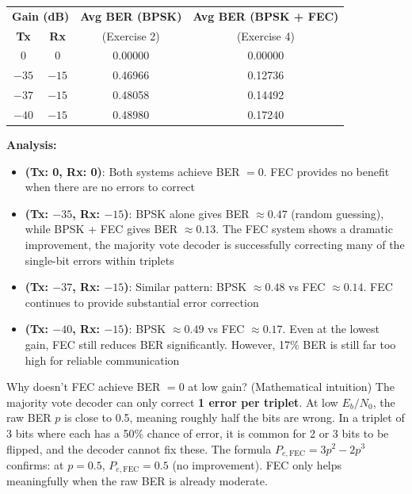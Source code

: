 \begin{center}
\renewcommand{\arraystretch}{1.4}
\begin{tabular}{cc|c|c}
\hline
\multicolumn{2}{c|}{\textbf{Gain (dB)}} & \textbf{Avg BER (BPSK)} & \textbf{Avg BER (BPSK + FEC)} \\
\textbf{Tx} & \textbf{Rx} & (Exercise 2) & (Exercise 4) \\
\hline
0 & 0 & 0.00000 & 0.00000 \\
$-35$ & $-15$ & 0.46966 & 0.12736 \\
$-37$ & $-15$ & 0.48058 & 0.14492 \\
$-40$ & $-15$ & 0.48980 & 0.17240 \\
\hline
\end{tabular}
\end{center}

\textbf{Analysis:}

\begin{itemize}
\item \textbf{(Tx: 0, Rx: 0)}: Both systems achieve BER $= 0$. FEC provides no benefit when there are no errors to correct

\item \textbf{(Tx: $-35$, Rx: $-15$)}: BPSK alone gives BER $\approx 0.47$ (random guessing), while BPSK + FEC gives BER $\approx 0.13$. The FEC system shows a dramatic improvement, the majority vote decoder is successfully correcting many of the single-bit errors within triplets

\item \textbf{(Tx: $-37$, Rx: $-15$)}: Similar pattern: BPSK $\approx 0.48$ vs FEC $\approx 0.14$. FEC continues to provide substantial error correction

\item \textbf{(Tx: $-40$, Rx: $-15$)}: BPSK $\approx 0.49$ vs FEC $\approx 0.17$. Even at the lowest gain, FEC still reduces BER significantly. However, 17\% BER is still far too high for reliable communication
\end{itemize}

\begin{IntuitionBox}{Why doesn't FEC achieve BER $= 0$ at low gain? (Mathematical intuition)}
The majority vote decoder can only correct \textbf{1 error per triplet}. At low $E_b/N_0$, the raw BER $p$ is close to 0.5, meaning roughly half the bits are wrong. In a triplet of 3 bits where each has a 50\% chance of error, it is common for 2 or 3 bits to be flipped, and the decoder cannot fix these. The formula $P_{e,\text{FEC}} = 3p^2 - 2p^3$ confirms: at $p = 0.5$, $P_{e,\text{FEC}} = 0.5$ (no improvement). FEC only helps meaningfully when the raw BER is already moderate.
\end{IntuitionBox}

